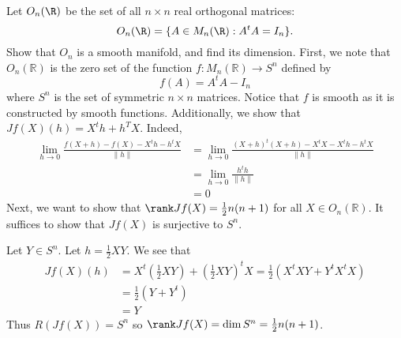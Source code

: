 \documentclass{../../../tex-setup/eh-homework}
\begin{document}
    \begin{question}{40}
        Let $O_n(\R)$ be the set of all $n\times n$ real orthogonal matrices:
        \[ O_n(\R) = \{A\in M_n(\R) : A^tA=I_n\}. \]
        Show that $O_n$ is a smooth manifold, and find its dimension.
        \tcblower
        First, we note that \(O_n(\mathbb{R})\) is the zero set of the function \(f: M_n(\mathbb{R}) \to S^n\) defined by
        \[
            f(A) = A^t A - I_n
        \]
        where \(S^n\) is the set of symmetric \(n\times n\) matrices. Notice that \(f\) is smooth as it is constructed by smooth functions. Additionally, we show that \(Jf(X)(h) = X^t h + h^T X\). Indeed,
        \begin{align*}
            \lim_{h \to 0} \frac{f(X + h) - f(X) - X^t h - h^t X}{\|h\|} &= \lim_{h \to 0} \frac{(X + h)^t (X + h) - X^t X - X^t h - h^t X}{\|h\|} \\
            &= \lim_{h \to 0} \frac{h^t h}{\|h\|} \\
            &= 0
        \end{align*}
        Next, we want to show that \(\rank Jf(X) = \frac{1}{2}n(n+1)\) for all \(X \in O_n(\mathbb{R})\). It suffices to show that \(Jf(X)\) is surjective to \(S^n\).

        Let \(Y \in S^n\). Let \(h = \frac{1}{2}XY\). We see that
        \begin{align*}
            Jf(X)(h) &= X^t \left( \frac{1}{2}XY \right) + \left( \frac{1}{2}XY \right)^t X = \frac{1}{2}\left( X^t XY + Y^t X^t X \right) \\
            &= \frac{1}{2}(Y + Y^t) \tag{\(X\) is orthogonal} \\
            &= Y \tag{\(Y\) is symmetric}
        \end{align*}
        Thus \(R(Jf(X)) = S^n\) so \(\rank Jf(X) = \dim S^n = \frac{1}{2}n(n+1)\).


\end{question}
\end{document}
